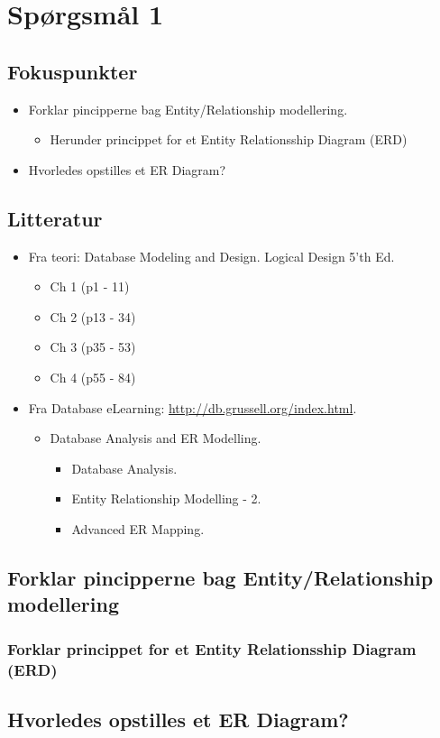 \section{Spørgsmål 1}

\subsection{Fokuspunkter}
\begin{itemize}
	\item Forklar pincipperne bag Entity/Relationship modellering.
	\begin{itemize}
		\item Herunder princippet for et Entity Relationsship Diagram (ERD)
	\end{itemize}
	\item Hvorledes opstilles et ER Diagram?
\end{itemize}

\subsection{Litteratur}
\begin{itemize}
	\item Fra teori: Database Modeling and Design. Logical Design 5'th Ed.
	\begin{itemize}
		\item Ch 1 (p1 - 11)
		\item Ch 2 (p13 - 34)
		\item Ch 3 (p35 - 53)
		\item Ch 4 (p55 - 84)
	\end{itemize}
	\item Fra Database eLearning: \url{http://db.grussell.org/index.html}.
	\begin{itemize}
		\item Database Analysis and ER Modelling.
		\begin{itemize}
			\item Database Analysis.
			\item Entity Relationship Modelling - 2.
			\item Advanced ER Mapping.
		\end{itemize}
	\end{itemize}
\end{itemize}

\newpage

\subsection{Forklar pincipperne bag Entity/Relationship modellering}

\subsubsection{Forklar princippet for et Entity Relationsship Diagram (ERD)}

\subsection{Hvorledes opstilles et ER Diagram?}
